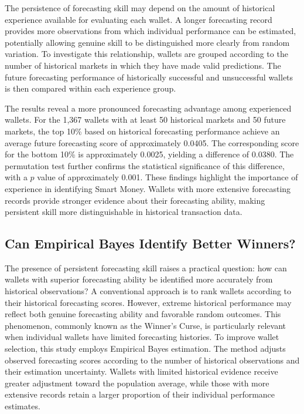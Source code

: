 The persistence of forecasting skill may depend on the amount of historical experience available for evaluating each wallet. A longer forecasting record provides more observations from which individual performance can be estimated, potentially allowing genuine skill to be distinguished more clearly from random variation. To investigate this relationship, wallets are grouped according to the number of historical markets in which they have made valid predictions. The future forecasting performance of historically successful and unsuccessful wallets is then compared within each experience group.

The results reveal a more pronounced forecasting advantage among experienced wallets. For the 1,367 wallets with at least 50 historical markets and 50 future markets, the top 10\% based on historical forecasting performance achieve an average future forecasting score of approximately 0.0405. The corresponding score for the bottom 10\% is approximately 0.0025, yielding a difference of 0.0380. The permutation test further confirms the statistical significance of this difference, with a $p$ value of approximately 0.001. These findings highlight the importance of experience in identifying Smart Money. Wallets with more extensive forecasting records provide stronger evidence about their forecasting ability, making persistent skill more distinguishable in historical transaction data.


\subsection{Can Empirical Bayes Identify Better Winners?}

The presence of persistent forecasting skill raises a practical question: how can wallets with superior forecasting ability be identified more accurately from historical observations? A conventional approach is to rank wallets according to their historical forecasting scores. However, extreme historical performance may reflect both genuine forecasting ability and favorable random outcomes. This phenomenon, commonly known as the Winner's Curse, is particularly relevant when individual wallets have limited forecasting histories. To improve wallet selection, this study employs Empirical Bayes estimation. The method adjusts observed forecasting scores according to the number of historical observations and their estimation uncertainty. Wallets with limited historical evidence receive greater adjustment toward the population average, while those with more extensive records retain a larger proportion of their individual performance estimates.


